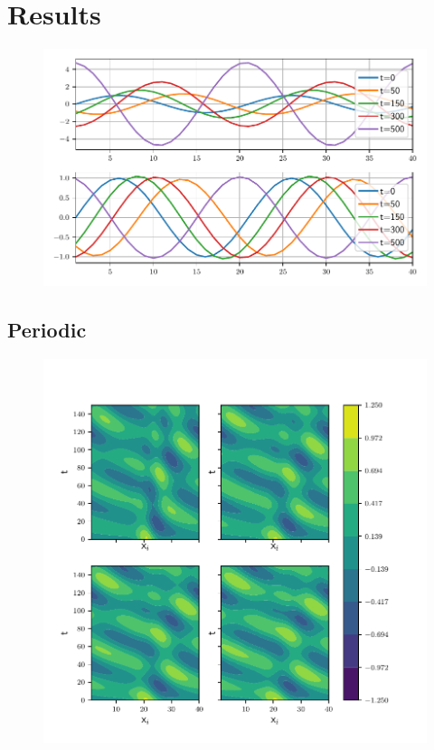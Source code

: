 \section{Results}

\begin{figure}[htp]
  \centering
  \includegraphics[width=\textwidth]{../figures/compare_dt_1.pdf}
  \caption{}
  \label{fig:compare}
\end{figure}


\subsection{Periodic}

\begin{figure}[htp]
  \centering
  \includegraphics[width=\textwidth]{../figures/hovmuller_sigma.pdf}
  \caption{}
  \label{fig:periodic_gauss}
\end{figure}


